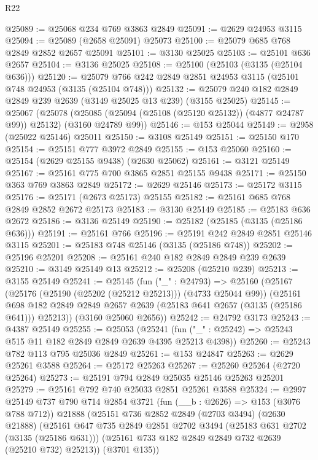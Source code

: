 \begin{lexlean}{R22}
\begin{coremodule}
@25089 := @25068 @234 @769 @3863 @2849
@25091 := @2629 @24953 @3115
@25094 := @25089 (@2658 @25091) @25073
@25100 := @25079 @685 @768 @2849 @2852 @2657 @25091
@25101 := @3130 @25025
@25103 := @25101 @636 @2657
@25104 := @3136 @25025
@25108 := @25100 (@25103 (@3135 (@25104 @636)))
@25120 := @25079 @766 @242 @2849 @2851 @24953 @3115 (@25101 @748 @24953 (@3135 (@25104 @748)))
@25132 := @25079 @240 @182 @2849 @2849 @239 @2639 (@3149 @25025 @13 @239) (@3155 @25025)
@25145 := @25067
    (@25078 (@25085 (@25094 (@25108 (@25120 @25132)) (@4877 @24787 @99)) @25132) (@3160 @24789 @99))
@25146 := @153 @25044
@25149 := @2958 (@25022 @25146) @25011
@25150 := @3108 @25149
@25151 := @25150 @170
@25154 := @25151 @777 @3972 @2849
@25155 := @153 @25060
@25160 := @25154 (@2629 @25155 @9438) (@2630 @25062)
@25161 := @3121 @25149
@25167 := @25161 @775 @700 @3865 @2851 @25155 @9438
@25171 := @25150 @363 @769 @3863 @2849
@25172 := @2629 @25146
@25173 := @25172 @3115
@25176 := @25171 (@2673 @25173) @25155
@25182 := @25161 @685 @768 @2849 @2852 @2672 @25173
@25183 := @3130 @25149
@25185 := @25183 @636 @2672
@25186 := @3136 @25149
@25190 := @25182 (@25185 (@3135 (@25186 @636)))
@25191 := @25161 @766
@25196 := @25191 @242 @2849 @2851 @25146 @3115
@25201 := @25183 @748 @25146 (@3135 (@25186 @748))
@25202 := @25196 @25201
@25208 := @25161 @240 @182 @2849 @2849 @239 @2639
@25210 := @3149 @25149 @13
@25212 := @25208 (@25210 @239)
@25213 := @3155 @25149
@25241 := @25145
    (fun ("_" : @24793) =>
    @25160
      (@25167
        (@25176 (@25190 (@25202 (@25212 @25213))) (@4733 @25044 @99))
        (@25161 @698 @182 @2849 @2849 @2657 @2639 (@25183 @641 @2657 (@3135 (@25186 @641))) @25213))
      (@3160 @25060 @2656))
@25242 := @24792 @3173
@25243 := @4387 @25149
@25255 := @25053
    (@25241 (fun ("_" : @25242) => @25243 @515 @11 @182 @2849 @2849 @2639 @4395 @25213 @4398))
@25260 := @25243 @782 @113 @795 @25036 @2849
@25261 := @153 @24847
@25263 := @2629 @25261 @3588
@25264 := @25172 @25263
@25267 := @25260 @25264 (@2720 @25264)
@25273 := @25191 @794 @2849 @25035 @25146 @25263 @25201
@25279 := @25161 @792 @740 @25033 @2851 @25261 @3588
@25324 := @2997
    @25149
    @737
    @790
    @714
    @2854
    @3721
    (fun (__b : @2626) => @153 (@3076 @788 @712))
    @21888
    (@25151
      @736
      @2852
      @2849
      (@2703 @3494)
      (@2630 @21888)
      (@25161
        @647
        @735
        @2849
        @2851
        @2702
        @3494
        (@25183 @631 @2702 (@3135 (@25186 @631)))
        (@25161 @733 @182 @2849 @2849 @732 @2639 (@25210 @732) @25213))
      (@3701 @135))

\end{coremodule}
\end{lexlean}
